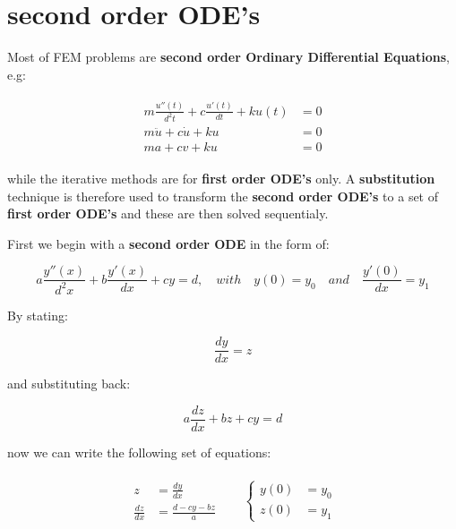 \documentclass[10pt,b5paper,titlepage]{book}
\newenvironment{ematrix}
{
    \begin{eqnarray}
        \begin{aligned}
}
{
        \end{aligned}
    \end{eqnarray}
}
\begin{document}
\section{second order ODE's}

Most of FEM problems are \textbf{second order Ordinary Differential Equations}, e.g:

\begin{ematrix}
    m \frac{u''(t)}{d^2 t} + c \frac{u'(t)}{dt} + k u(t) &= 0\\
    m \ddot{u} + c \dot{u} + k u &= 0\\
    m a + c v + ku &= 0
\end{ematrix}

while the iterative methods are for \textbf{first order ODE's} only.
A \textbf{substitution} technique is therefore used to transform the
\textbf{second order ODE's} to a set of \textbf{first order ODE's} and these are
then solved sequentialy.

First we begin with a \textbf{second order ODE} in the form of:

\begin{equation}
    a \frac{y''(x)}{d^2 x} + b \frac{y'(x)}{dx} + c y = d, \quad with \quad y(0) = y_0 \quad and \quad
    \frac{y'(0)}{dx} = y_1
\end{equation}

By stating:

\begin{equation}
    \frac{dy}{dx} = z
\end{equation}

and substituting back:

\begin{equation}
    a \frac{dz}{dx} + b z + c y = d
\end{equation}

now we can write the following set of equations:

\begin{ematrix}
    \begin{aligned}
        z &= \frac{dy}{dx}\\
        \frac{dz}{dx} &= \frac{d - c y - b z}{a}
    \end{aligned} &
    \quad \left\{
    \begin{aligned}
        y(0) &= y_0\\
        z(0) &= y_1
    \end{aligned} \right.
\end{ematrix}
\end{document}
